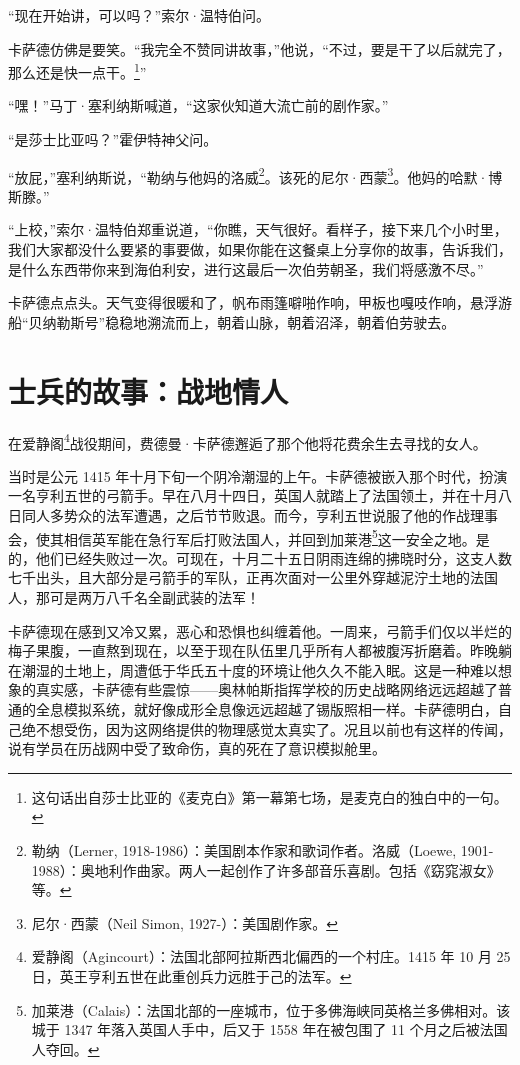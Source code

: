 \documentclass[AutoFakeBold=true]{book}
\begin{document}
``现在开始讲，可以吗？''索尔·温特伯问。

卡萨德仿佛是要笑。``我完全不赞同讲故事，''他说，``不过，要是干了以后就完了，那么还是快一点干。\footnote{这句话出自莎士比亚的《麦克白》第一幕第七场，是麦克白的独白中的一句。}''

``嘿！''马丁·塞利纳斯喊道，``这家伙知道大流亡前的剧作家。''

``是莎士比亚吗？''霍伊特神父问。

``放屁，''塞利纳斯说，``勒纳与他妈的洛威\footnote{勒纳（Lerner, 1918-1986）：美国剧本作家和歌词作者。洛威（Loewe, 1901-1988）：奥地利作曲家。两人一起创作了许多部音乐喜剧。包括《窈窕淑女》等。}。该死的尼尔·西蒙\footnote{尼尔·西蒙（Neil Simon, 1927-）：美国剧作家。}。他妈的哈默·博斯滕。''

``上校，''索尔·温特伯郑重说道，``你瞧，天气很好。看样子，接下来几个小时里，我们大家都没什么要紧的事要做，如果你能在这餐桌上分享你的故事，告诉我们，是什么东西带你来到海伯利安，进行这最后一次伯劳朝圣，我们将感激不尽。''

卡萨德点点头。天气变得很暖和了，帆布雨篷噼啪作响，甲板也嘎吱作响，悬浮游船``贝纳勒斯号''稳稳地溯流而上，朝着山脉，朝着沼泽，朝着伯劳驶去。

\section{士兵的故事：战地情人}

在爱静阁\footnote{爱静阁（Agincourt）：法国北部阿拉斯西北偏西的一个村庄。1415 年 10 月 25 日，英王亨利五世在此重创兵力远胜于己的法军。}战役期间，费德曼·卡萨德邂逅了那个他将花费余生去寻找的女人。

当时是公元 1415 年十月下旬一个阴冷潮湿的上午。卡萨德被嵌入那个时代，扮演一名亨利五世的弓箭手。早在八月十四日，英国人就踏上了法国领土，并在十月八日同人多势众的法军遭遇，之后节节败退。而今，亨利五世说服了他的作战理事会，使其相信英军能在急行军后打败法国人，并回到加莱港\footnote{加莱港（Calais）：法国北部的一座城市，位于多佛海峡同英格兰多佛相对。该城于 1347 年落入英国人手中，后又于 1558 年在被包围了 11 个月之后被法国人夺回。}这一安全之地。是的，他们已经失败过一次。可现在，十月二十五日阴雨连绵的拂晓时分，这支人数七千出头，且大部分是弓箭手的军队，正再次面对一公里外穿越泥泞土地的法国人，那可是两万八千名全副武装的法军！

卡萨德现在感到又冷又累，恶心和恐惧也纠缠着他。一周来，弓箭手们仅以半烂的梅子果腹，一直熬到现在，以至于现在队伍里几乎所有人都被腹泻折磨着。昨晚躺在潮湿的土地上，周遭低于华氏五十度的环境让他久久不能入眠。这是一种难以想象的真实感，卡萨德有些震惊——奥林帕斯指挥学校的历史战略网络远远超越了普通的全息模拟系统，就好像成形全息像远远超越了锡版照相一样。卡萨德明白，自己绝不想受伤，因为这网络提供的物理感觉太真实了。况且以前也有这样的传闻，说有学员在历战网中受了致命伤，真的死在了意识模拟舱里。
\end{document}
